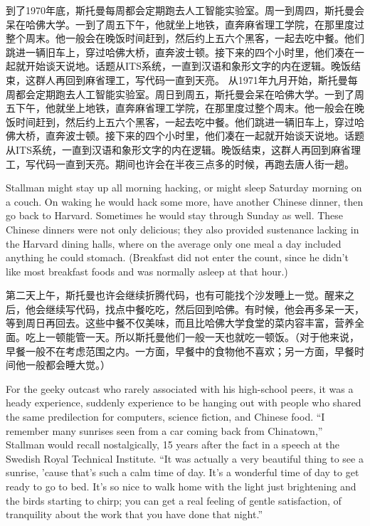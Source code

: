 \ifdefined\chs
\ifdefined\vone
到了1970年底，斯托曼每周都会定期跑去人工智能实验室。周一到周四，斯托曼会呆在哈佛大学。一到了周五下午，他就坐上地铁，直奔麻省理工学院，在那里度过整个周末。他一般会在晚饭时间赶到，然后约上五六个黑客，一起去吃中餐。他们跳进一辆旧车上，穿过哈佛大桥，直奔波士顿。接下来的四个小时里，他们凑在一起就开始谈天说地。话题从ITS系统，一直到汉语和象形文字的内在逻辑。晚饭结束，这群人再回到麻省理工，写代码一直到天亮。
\fi
\ifdefined\vtwo
从1971年九月开始，斯托曼每周都会定期跑去人工智能实验室。周日到周五，斯托曼会呆在哈佛大学。一到了周五下午，他就坐上地铁，直奔麻省理工学院，在那里度过整个周末。他一般会在晚饭时间赶到，然后约上五六个黑客，一起去吃中餐。他们跳进一辆旧车上，穿过哈佛大桥，直奔波士顿。接下来的四个小时里，他们凑在一起就开始谈天说地。话题从ITS系统，一直到汉语和象形文字的内在逻辑。晚饭结束，这群人再回到麻省理工，写代码一直到天亮。期间也许会在半夜三点多的时候，再跑去唐人街一趟。
\fi
\fi

\ifdefined\vtwo
\ifdefined\eng
Stallman might stay up all morning hacking, or might sleep Saturday morning on a couch. On waking he would hack some more, have another Chinese dinner, then go back to Harvard.  Sometimes he would stay through Sunday as well.  These Chinese dinners were not only delicious; they also provided sustenance lacking in the Harvard dining halls, where on the average only one meal a day included anything he could stomach. (Breakfast did not enter the count, since he didn't like most breakfast foods and was normally asleep at that hour.)
\fi

\ifdefined\chs
第二天上午，斯托曼也许会继续折腾代码，也有可能找个沙发睡上一觉。醒来之后，他会继续写代码，找点中餐吃吃，然后回到哈佛。有时候，他会再多呆一天，等到周日再回去。这些中餐不仅美味，而且比哈佛大学食堂的菜内容丰富，营养全面。吃上一顿能管一天。所以斯托曼他们一般一天也就吃一顿饭。（对于他来说，早餐一般不在考虑范围之内。一方面，早餐中的食物他不喜欢；另一方面，早餐时间他一般都会睡大觉。）
\fi
\fi

\ifdefined\eng
For the geeky outcast who rarely associated with his high-school peers, it was a heady \ifdefined\vone experience, suddenly \fi\ifdefined\vtwo experience to be \fi hanging out with people who shared the same predilection for computers, science fiction, and Chinese food. ``I remember many sunrises seen from a car coming back from Chinatown,'' Stallman would recall nostalgically, 15 years after the fact in a speech at the Swedish Royal Technical Institute. ``It was actually a very beautiful thing to see a sunrise, 'cause that's such a calm time of day. It's a wonderful time of day to get ready to go to bed. It's so nice to walk home with the light just brightening and the birds starting to chirp; you can get a real feeling of gentle satisfaction, of tranquility about the work that you have done that night.''
\fi

